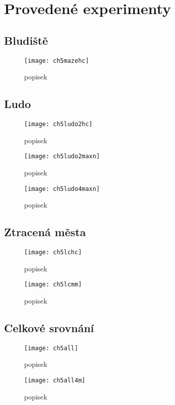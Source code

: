 \chapter{Provedené experimenty}

\section{Bludiště}

\begin{figure}
  \centering
  \texttt{[image: ch5mazehc]}
	\caption{popisek }
	\label{fig-ch5mazehc}
\end{figure}

\section{Ludo}

\begin{figure}
  \centering
  \texttt{[image: ch5ludo2hc]}
	\caption{popisek }
	\label{fig-ch5ludo2hc}
\end{figure}

\begin{figure}
  \centering
  \texttt{[image: ch5ludo2maxn]}
	\caption{popisek }
	\label{fig-ch5ludo2maxn}
\end{figure}

\begin{figure}
  \centering
  \texttt{[image: ch5ludo4maxn]}
	\caption{popisek }
	\label{fig-ch5ludo4maxn}
\end{figure}

\section{Ztracená města}

\begin{figure}
  \centering
  \texttt{[image: ch5lchc]}
	\caption{popisek }
	\label{fig-ch5lchc}
\end{figure}

\begin{figure}
  \centering
  \texttt{[image: ch5lcmm]}
	\caption{popisek }
	\label{fig-ch5lcmm}
\end{figure}

\section{Celkové srovnání}
\begin{figure}
  \centering
  \texttt{[image: ch5all]}
	\caption{ popisek }
	\label{fig-ch5all}
\end{figure}

\begin{figure}
  \centering
  \texttt{[image: ch5all4m]}
	\caption{ popisek }
	\label{fig-ch5all4m}
\end{figure}

\endinput
